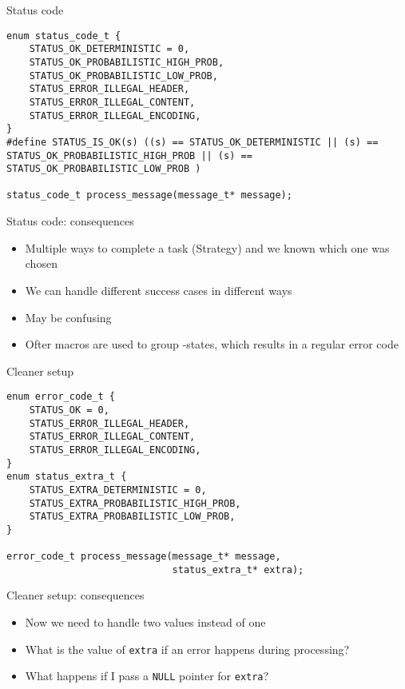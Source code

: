 \documentclass[aspectratio=169,14pt]{beamer}
\begin{document}
\begin{frame}[fragile]{Status code}
\begin{lstlisting}[style=cstyle]
enum status_code_t {
    STATUS_OK_DETERMINISTIC = 0,
    STATUS_OK_PROBABILISTIC_HIGH_PROB,
    STATUS_OK_PROBABILISTIC_LOW_PROB,
    STATUS_ERROR_ILLEGAL_HEADER,
    STATUS_ERROR_ILLEGAL_CONTENT,
    STATUS_ERROR_ILLEGAL_ENCODING,
}
#define STATUS_IS_OK(s) ((s) == STATUS_OK_DETERMINISTIC || (s) == STATUS_OK_PROBABILISTIC_HIGH_PROB || (s) == STATUS_OK_PROBABILISTIC_LOW_PROB )

status_code_t process_message(message_t* message);
\end{lstlisting}
\end{frame}


\begin{frame}[fragile]{Status code: consequences}
\begin{itemize}
    \item Multiple ways to complete a task (Strategy) and we known which one was chosen
    \item We can handle different success cases in different ways
    \item May be confusing
    \item Ofter macros are used to group -states, which results in a regular error code
\end{itemize}
\end{frame}


\begin{frame}[fragile]{Cleaner setup}
\begin{lstlisting}[style=cstyle]
enum error_code_t {
    STATUS_OK = 0,
    STATUS_ERROR_ILLEGAL_HEADER,
    STATUS_ERROR_ILLEGAL_CONTENT,
    STATUS_ERROR_ILLEGAL_ENCODING,
}
enum status_extra_t {
    STATUS_EXTRA_DETERMINISTIC = 0,
    STATUS_EXTRA_PROBABILISTIC_HIGH_PROB,
    STATUS_EXTRA_PROBABILISTIC_LOW_PROB,
}

error_code_t process_message(message_t* message,
                             status_extra_t* extra);
\end{lstlisting}
\end{frame}


\begin{frame}[fragile]{Cleaner setup: consequences}
\begin{itemize}
    \item Now we need to handle two values instead of one
    \item What is the value of \texttt{extra} if an error happens during processing?
    \item What happens if I pass a \texttt{NULL} pointer for \texttt{extra}?
\end{itemize}
\end{frame}
\end{document}
